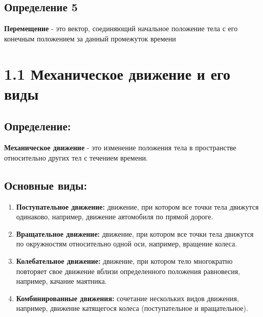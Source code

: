 \documentclass[a4paper,12pt]{article}
\begin{document}
\subsection*{Определение 5}
\vspace{-3pt}
\textbf{Перемещение} - это вектор, соединяющий начальное положение тела с его конечным положением за данный промежуток времени

\vspace{10pt}


\section*{1.1 Механическое движение и его виды}

\vspace{-9pt}
\subsection*{Определение:}
\vspace{-3pt}

\textbf{Механическое движение} - это изменение положения тела в пространстве относительно других тел с течением времени.

\vspace{-9pt}
\subsection*{Основные виды:}
\vspace{-3pt}

\begin{enumerate} [itemsep=0pt, topsep=0pt, parsep=3pt]
  \item \textbf{Поступательное движение:} движение, при котором все точки тела движутся одинаково, например, движение автомобиля по прямой дороге.
  \item \textbf{Вращательное движение:} движение, при котором все точки тела движутся по окружностям относительно одной оси, например, вращение колеса.
  \item \textbf{Колебательное движение:} движение, при котором тело многократно повторяет свое движение вблизи определенного положения равновесия, например, качание маятника.
  \item \textbf{Комбинированные движения:} сочетание нескольких видов движения, например, движение катящегося колеса (поступательное и вращательное).
\end{enumerate}
\end{document}
